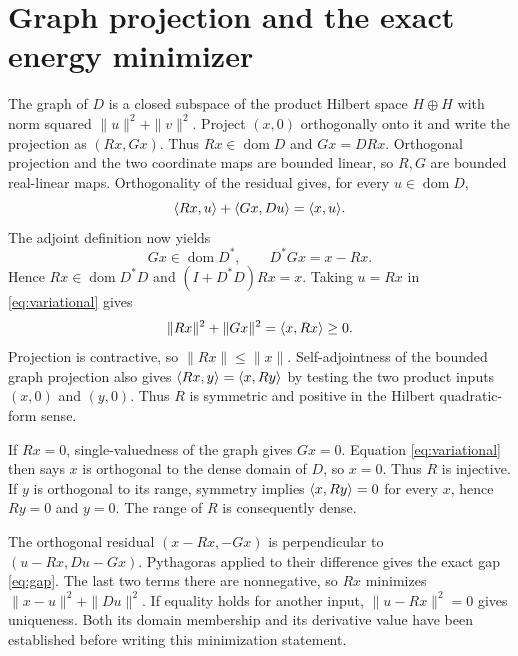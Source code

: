 \documentclass[11pt]{article}
\newcommand{\dom}{\operatorname{dom}}\newcommand{\ran}{\operatorname{ran}}
\begin{document}
\section{Graph projection and the exact energy minimizer}
The graph of $D$ is a closed subspace of the product Hilbert
space $H\oplus H$ with norm squared $\|u\|^2+\|v\|^2$.
Project $(x,0)$ orthogonally onto it and write the projection
as $(Rx,Gx)$. Thus $Rx\in\dom D$ and $Gx=DRx$.
Orthogonal projection and the two coordinate maps are bounded
linear, so $R,G$ are bounded real-linear maps. Orthogonality
of the residual gives, for every $u\in\dom D$,
\begin{equation}\label{eq:variational}
 \langle Rx,u\rangle+\langle Gx,Du\rangle=\langle x,u\rangle.
\end{equation}
The adjoint definition now yields
\[
 Gx\in\dom D^*,\qquad D^*Gx=x-Rx.
\]
Hence $Rx\in\dom D^*D$ and $(I+D^*D)Rx=x$.
Taking $u=Rx$ in \eqref{eq:variational} gives
\begin{equation}\label{eq:energyidentity}
 \|Rx\|^2+\|Gx\|^2=\langle x,Rx\rangle\geq0.
\end{equation}
Projection is contractive, so $\|Rx\|\leq\|x\|$.
Self-adjointness of the bounded graph projection also gives
$\langle Rx,y\rangle=\langle x,Ry\rangle$ by testing the two product inputs $(x,0)$
and $(y,0)$. Thus $R$ is symmetric and positive in the Hilbert
quadratic-form sense.

If $Rx=0$, single-valuedness of the graph gives $Gx=0$.
Equation \eqref{eq:variational} then says $x$ is orthogonal to
the dense domain of $D$, so $x=0$. Thus $R$ is injective.
If $y$ is orthogonal to its range, symmetry implies
$\langle x,Ry\rangle=0$ for every $x$, hence $Ry=0$ and $y=0$.
The range of $R$ is consequently dense.

The orthogonal residual $(x-Rx,-Gx)$ is perpendicular to
$(u-Rx,Du-Gx)$. Pythagoras applied to their difference gives
the exact gap \eqref{eq:gap}. The last two terms there are
nonnegative, so $Rx$ minimizes $\|x-u\|^2+\|Du\|^2$.
If equality holds for another input, $\|u-Rx\|^2=0$ gives
uniqueness. Both its domain membership and its derivative value
have been established before writing this minimization statement.
\end{document}
